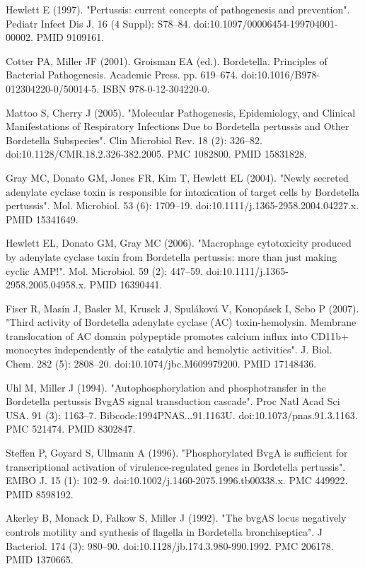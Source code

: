 \documentclass[11pt]{article}
\begin{document}
\begin{thebibliography}{3}
	 Hewlett E (1997). "Pertussis: current concepts of pathogenesis and prevention". Pediatr Infect Dis J. 16 (4 Suppl): S78–84. doi:10.1097/00006454-199704001-00002. PMID 9109161.
	
	 Cotter PA, Miller JF (2001). Groisman EA (ed.). Bordetella. Principles of Bacterial Pathogenesis. Academic Press. pp. 619–674. doi:10.1016/B978-012304220-0/50014-5. ISBN 978-0-12-304220-0.
	
	 Mattoo S, Cherry J (2005). "Molecular Pathogenesis, Epidemiology, and Clinical Manifestations of Respiratory Infections Due to Bordetella pertussis and Other Bordetella Subspecies". Clin Microbiol Rev. 18 (2): 326–82. doi:10.1128/CMR.18.2.326-382.2005. PMC 1082800. PMID 15831828.
	
	 Gray MC, Donato GM, Jones FR, Kim T, Hewlett EL (2004). "Newly secreted adenylate cyclase toxin is responsible for intoxication of target cells by Bordetella pertussis". Mol. Microbiol. 53 (6): 1709–19. doi:10.1111/j.1365-2958.2004.04227.x. PMID 15341649.
	
	 Hewlett EL, Donato GM, Gray MC (2006). "Macrophage cytotoxicity produced by adenylate cyclase toxin from Bordetella pertussis: more than just making cyclic AMP!". Mol. Microbiol. 59 (2): 447–59. doi:10.1111/j.1365-2958.2005.04958.x. PMID 16390441.
	
	 Fiser R, Masín J, Basler M, Krusek J, Spuláková V, Konopásek I, Sebo P (2007). "Third activity of Bordetella adenylate cyclase (AC) toxin-hemolysin. Membrane translocation of AC domain polypeptide promotes calcium influx into CD11b+ monocytes independently of the catalytic and hemolytic activities". J. Biol. Chem. 282 (5): 2808–20. doi:10.1074/jbc.M609979200. PMID 17148436.
	
	Uhl M, Miller J (1994). "Autophosphorylation and phosphotransfer in the Bordetella pertussis BvgAS signal transduction cascade". Proc Natl Acad Sci USA. 91 (3): 1163–7. Bibcode:1994PNAS...91.1163U. doi:10.1073/pnas.91.3.1163. PMC 521474. PMID 8302847.
	
	 Steffen P, Goyard S, Ullmann A (1996). "Phosphorylated BvgA is sufficient for transcriptional activation of virulence-regulated genes in Bordetella pertussis". EMBO J. 15 (1): 102–9. doi:10.1002/j.1460-2075.1996.tb00338.x. PMC 449922. PMID 8598192.
	
	 Akerley B, Monack D, Falkow S, Miller J (1992). "The bvgAS locus negatively controls motility and synthesis of flagella in Bordetella bronchiseptica". J Bacteriol. 174 (3): 980–90. doi:10.1128/jb.174.3.980-990.1992. PMC 206178. PMID 1370665.
	

\end{thebibliography}
\end{document}
